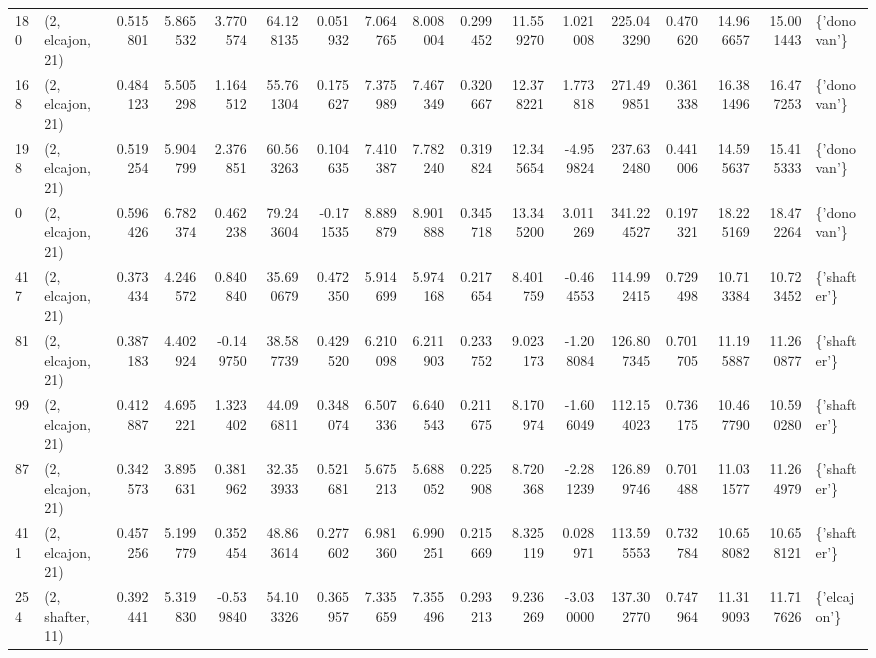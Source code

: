 \begin{tabular}{llrrrrrrrrrrrrrrl}
180 &  (2, elcajon, 21) &   0.515801 &   5.865532 &   3.770574 &    64.128135 &   0.051932 &   7.064765 &   8.008004 &  0.299452 &  11.559270 &   1.021008 &   225.043290 &   0.470620 &  14.966657 &  15.001443 &  \{'donovan'\} \\
168 &  (2, elcajon, 21) &   0.484123 &   5.505298 &   1.164512 &    55.761304 &   0.175627 &   7.375989 &   7.467349 &  0.320667 &  12.378221 &   1.773818 &   271.499851 &   0.361338 &  16.381496 &  16.477253 &  \{'donovan'\} \\
198 &  (2, elcajon, 21) &   0.519254 &   5.904799 &   2.376851 &    60.563263 &   0.104635 &   7.410387 &   7.782240 &  0.319824 &  12.345654 &  -4.959824 &   237.632480 &   0.441006 &  14.595637 &  15.415333 &  \{'donovan'\} \\
0   &  (2, elcajon, 21) &   0.596426 &   6.782374 &   0.462238 &    79.243604 &  -0.171535 &   8.889879 &   8.901888 &  0.345718 &  13.345200 &   3.011269 &   341.224527 &   0.197321 &  18.225169 &  18.472264 &  \{'donovan'\} \\
417 &  (2, elcajon, 21) &   0.373434 &   4.246572 &   0.840840 &    35.690679 &   0.472350 &   5.914699 &   5.974168 &  0.217654 &   8.401759 &  -0.464553 &   114.992415 &   0.729498 &  10.713384 &  10.723452 &  \{'shafter'\} \\
81  &  (2, elcajon, 21) &   0.387183 &   4.402924 &  -0.149750 &    38.587739 &   0.429520 &   6.210098 &   6.211903 &  0.233752 &   9.023173 &  -1.208084 &   126.807345 &   0.701705 &  11.195887 &  11.260877 &  \{'shafter'\} \\
99  &  (2, elcajon, 21) &   0.412887 &   4.695221 &   1.323402 &    44.096811 &   0.348074 &   6.507336 &   6.640543 &  0.211675 &   8.170974 &  -1.606049 &   112.154023 &   0.736175 &  10.467790 &  10.590280 &  \{'shafter'\} \\
87  &  (2, elcajon, 21) &   0.342573 &   3.895631 &   0.381962 &    32.353933 &   0.521681 &   5.675213 &   5.688052 &  0.225908 &   8.720368 &  -2.281239 &   126.899746 &   0.701488 &  11.031577 &  11.264979 &  \{'shafter'\} \\
411 &  (2, elcajon, 21) &   0.457256 &   5.199779 &   0.352454 &    48.863614 &   0.277602 &   6.981360 &   6.990251 &  0.215669 &   8.325119 &   0.028971 &   113.595553 &   0.732784 &  10.658082 &  10.658121 &  \{'shafter'\} \\
254 &  (2, shafter, 11) &   0.392441 &   5.319830 &  -0.539840 &    54.103326 &   0.365957 &   7.335659 &   7.355496 &  0.293213 &   9.236269 &  -3.030000 &   137.302770 &   0.747964 &  11.319093 &  11.717626 &  \{'elcajon'\} \\

\end{tabular}
